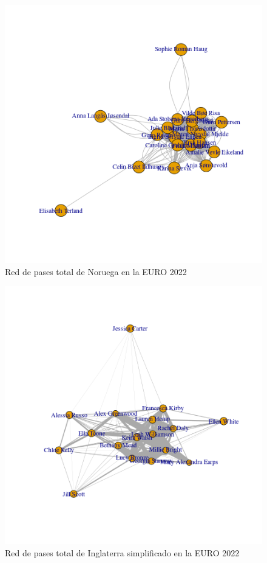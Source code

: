 \begin{figure}[h!]
    \centering
     \includegraphics[width=\textwidth]{./img/plot_norw.png}
     \caption{Red de pases total de Noruega en la EURO 2022}
     \label{img:red:nor:tot}
\end{figure}

\begin{figure}[h!]
    \centering
     \includegraphics[width=\textwidth]{./img/plot_england_simpl.png}
     \caption{Red de pases total de Inglaterra simplificado en la EURO 2022}
     \label{img:red:eng}
\end{figure}

